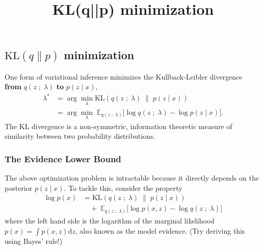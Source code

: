 \title{KL(q||p) minimization}

\subsection{$\text{KL}(q\|p)$ minimization}

One form of variational inference minimizes the Kullback-Leibler divergence
\textbf{from} $q(z\;;\;\lambda)$ \textbf{to} $p(z \mid x)$,
\begin{align*}
  \lambda^*
  &=
  \arg\min_\lambda \text{KL}(
  q(z\;;\;\lambda)
  \;\|\;
  p(z \mid x)
  )\\
  &=
  \arg\min_\lambda\;
  \mathbb{E}_{q(z\;;\;\lambda)}
  \big[
  \log q(z\;;\;\lambda)
  -
  \log p(z \mid x)
  \big].
\end{align*}
The KL divergence is a non-symmetric, information theoretic measure of
similarity between two probability distributions.

\subsubsection{The Evidence Lower Bound}

The above optimization problem is intractable because it directly depends on the
posterior $p(z \mid x)$. To tackle this, consider the property
\begin{align*}
  \log p(x)
  &=
  \text{KL}(
  q(z\;;\;\lambda)
  \;\|\;
  p(z \mid x)
  )\\
  &\quad+\;
  \mathbb{E}_{q(z\;;\;\lambda)}
  \big[
  \log p(x, z)
  -
  \log q(z\;;\;\lambda)
  \big]
\end{align*}
where the left hand side is the logarithm of the marginal likelihood
$p(x) = \int p(x,z) \text{d}z$, also known as the model evidence. (Try
deriving this using Bayes' rule!)

